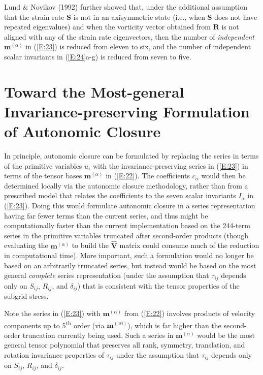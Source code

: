 Lund $\&$ Novikov (1992) further showed that, under the additional assumption that the strain rate $\mathbf{S}$ is not in an axisymmetric state (i.e., when $\mathbf{S}$ does not have repeated eigenvalues) and when the vorticity vector obtained from $\mathbf{R}$ is not aligned with any of the strain rate eigenvectors, then the number of \textit{independent} $\mathbf{m}^{(\alpha)}$ in (\ref{E:23}) is reduced from eleven to six, and the number of independent scalar invariants in (\ref{E:24}a-g) is reduced from seven to five. 


\section{Toward the Most-general Invariance-preserving Formulation of Autonomic Closure} 
\label{sec:1B}

In principle, autonomic closure can be formulated by replacing the  series in terms of the primitive variables $u_i$  with the invariance-preserving series in (\ref{E:23}) in terms of the tensor bases $\mathbf{m}^{(\alpha)}$  in (\ref{E:22}). The coefficients $c_{\alpha}$  would then be determined locally via the autonomic closure methodology, rather than from a prescribed model that relates the coefficients to the seven scalar invariants $I_{\alpha}$ in (\ref{E:23}). Doing this would formulate autonomic closure in a series representation having far fewer terms than the current  series, and thus might be computationally faster than the current implementation based on the 244-term series in the primitive variables truncated after second-order products (though evaluating the  $\mathbf{m}^{(\alpha)}$  to build the $\mathbf{\widehat{V}}$  matrix could consume much of the reduction in computational time). More important, such a formulation would no longer be based on an arbitrarily truncated  series, but instead would be based on the most general \textit{complete} series representation (under the assumption that $\tau_{ij}$  depends only on $S_{ij}$, $R_{ij}$, and $\delta_{ij}$) that is consistent with the tensor properties of the subgrid stress. 

Note the series in (\ref{E:23}) with  $\mathbf{m}^{(\alpha)}$ from (\ref{E:22}) involves products of velocity components up to 5\textsuperscript{th} order (via $\mathbf{m}^{(10)}$), which is far higher than the second-order truncation currently being used. Such a series in  $\mathbf{m}^{(\alpha)}$ would be the most general tensor polynomial that preserves all rank, symmetry, translation, and rotation invariance properties of  $\tau_{ij}$ under the assumption that  $\tau_{ij}$ depends only on $S_{ij}$, $R_{ij}$, and $\delta_{ij}$.

